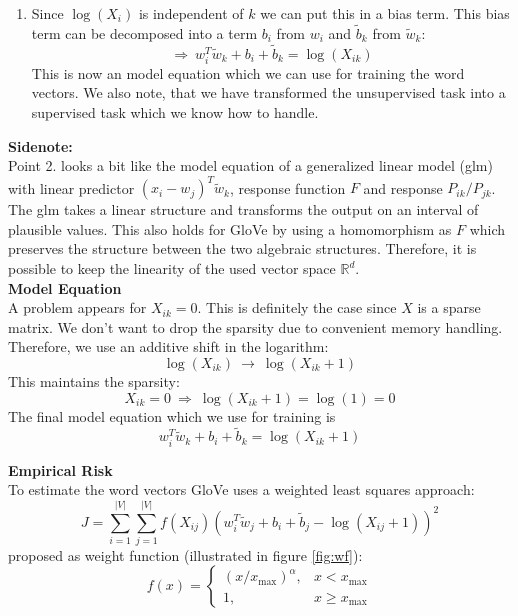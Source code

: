 \begin{enumerate}
\begin{enumerate}
        \item
          Since $\log(X_i)$ is independent of $k$ we can put this in a bias term. This
          bias term can be decomposed into a term $b_i$ from $w_i$ and 
          $\tilde{b}_k$ from $\tilde{w}_k$:
          \[
          \Rightarrow\ w_i^T\tilde{w}_k + b_i + \tilde{b}_k = \log(X_{ik})
          \]
          This is now an model equation which we can use for training the word vectors.
          We also note, that we have transformed the unsupervised task into a 
          supervised task which we know how to handle.
      \end{enumerate}
\end{enumerate}

\textbf{Sidenote:} \\

Point 2. looks a bit like the model equation of a generalized linear model (glm) 
with linear predictor $(x_i - w_j)^T\tilde{w}_k$, response function $F$ and response 
$P_{ik} / P_{jk}$. The glm takes a linear structure and transforms the output on an
interval of plausible values. This also holds for GloVe by using a homomorphism as $F$
which preserves the structure between the two algebraic structures. Therefore, it 
is possible to keep the linearity of the used vector space $\mathbb{R}^d$. \\

\textbf{Model Equation} \\

A problem appears for $X_{ik} = 0$. This is definitely the case since $X$ is 
a sparse matrix. We don't want to drop the sparsity due to convenient
memory handling. Therefore, we use an additive shift in the logarithm:
\[
\log(X_{ik})\ \rightarrow\ \log(X_{ik} + 1)
\]
This maintains the sparsity: 
\[
X_{ik} = 0\ \Rightarrow\ \log(X_{ik} + 1) = \log(1) = 0
\]
The final model equation which we use for training is
\[
w_i^T\tilde{w}_k + b_i + \tilde{b}_k = \log(X_{ik} + 1)
\]

\textbf{Empirical Risk} \\

To estimate the word vectors GloVe uses a weighted least squares approach:
\[
J = \sum\limits_{i=1}^{|V|}\sum\limits_{j=1}^{|V|}f(X_{ij})\left(w_i^T\tilde{w}_j + b_i + \tilde{b}_j - \log(X_{ij} + 1)\right)^2
\]
\cite{pennington2014glove} proposed as weight function (illustrated in figure \ref{fig:wf}):
\[
f(x) = \left\{
\begin{array}{ccc}
(x / x_\mathrm{max})^\alpha, & x < x_\mathrm{max} \\
1, & x \geq x_\mathrm{max}
\end{array}
\right.
\]

